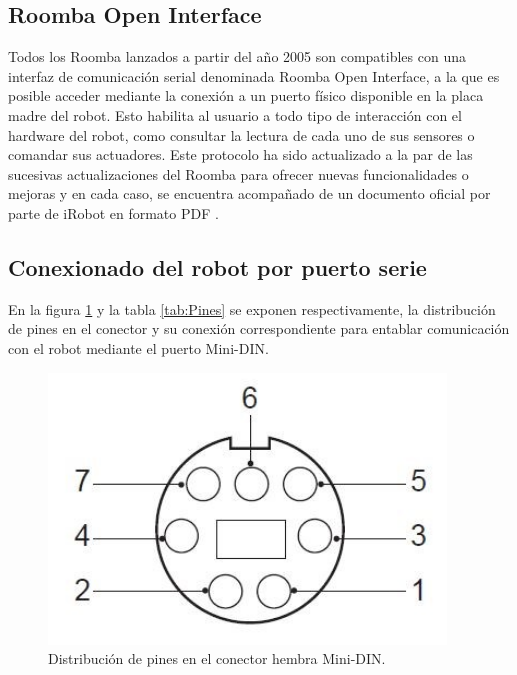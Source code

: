 \subsection{Roomba Open Interface}\label{sec:openInterface}

Todos los Roomba lanzados a partir del año 2005 son compatibles con una interfaz de comunicación serial denominada Roomba Open Interface, a la que es posible acceder mediante la conexión a un puerto físico disponible en la placa madre del robot. Esto habilita al usuario a todo tipo de interacción con el hardware del robot, como consultar la lectura de cada uno de sus sensores o comandar sus actuadores. Este protocolo ha sido actualizado a la par de las sucesivas actualizaciones del Roomba para ofrecer nuevas funcionalidades o mejoras y en cada caso, se encuentra acompañado de un documento oficial por parte de iRobot en formato PDF \citep{PAPER:5}.

\subsection{Conexionado del robot por puerto serie}

En la figura \ref{fig:roombaPinout} y la tabla \ref{tab:Pines} se exponen respectivamente, la distribución de pines en el conector y su conexión correspondiente para entablar comunicación con el robot mediante el puerto Mini-DIN.

\begin{figure}[ht]
    \centering
    \includegraphics[scale=.3]{./Figures/pinout.png}
    \caption{Distribución de pines en el conector hembra Mini-DIN.}
    \label{fig:roombaPinout}
\end{figure}

